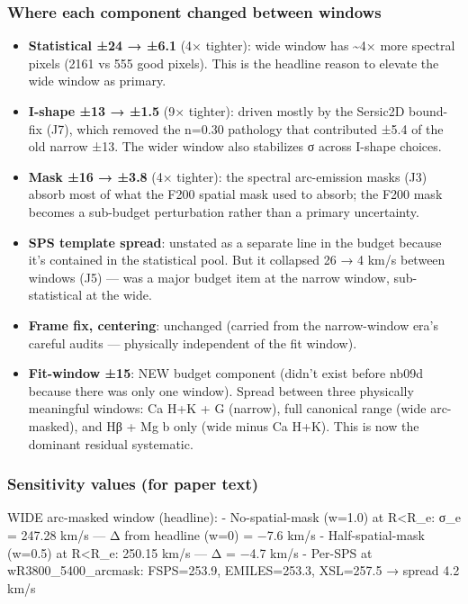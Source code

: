 \documentclass[
  10pt,
]{article}
\providecommand{\tightlist}{%
  \setlength{\itemsep}{0pt}\setlength{\parskip}{0pt}}
\begin{document}
\hypertarget{where-each-component-changed-between-windows}{%
\subsubsection{Where each component changed between windows}\label{where-each-component-changed-between-windows}}

\begin{itemize}
\tightlist
\item
  \textbf{Statistical ±24 → ±6.1} (4× tighter): wide window has \textasciitilde4× more spectral pixels (2161 vs 555 good pixels). This is the headline reason to elevate the wide window as primary.
\item
  \textbf{I-shape ±13 → ±1.5} (9× tighter): driven mostly by the Sersic2D bound-fix (J7), which removed the n=0.30 pathology that contributed ±5.4 of the old narrow ±13. The wider window also
  stabilizes σ across I-shape choices.
\item
  \textbf{Mask ±16 → ±3.8} (4× tighter): the spectral arc-emission masks (J3) absorb most of what the F200 spatial mask used to absorb; the F200 mask becomes a sub-budget perturbation rather than a
  primary uncertainty.
\item
  \textbf{SPS template spread}: unstated as a separate line in the budget because it's contained in the statistical pool. But it collapsed 26 → 4 km/s between windows (J5) --- was a major budget item
  at the narrow window, sub-statistical at the wide.
\item
  \textbf{Frame fix, centering}: unchanged (carried from the narrow-window era's careful audits --- physically independent of the fit window).
\item
  \textbf{Fit-window ±15}: NEW budget component (didn't exist before nb09d because there was only one window). Spread between three physically meaningful windows: Ca H+K + G (narrow), full canonical
  range (wide arc-masked), and Hβ + Mg b only (wide minus Ca H+K). This is now the dominant residual systematic.
\end{itemize}

\hypertarget{sensitivity-values-for-paper-text}{%
\subsubsection{Sensitivity values (for paper text)}\label{sensitivity-values-for-paper-text}}

WIDE arc-masked window (headline): - No-spatial-mask (w=1.0) at R\textless R\_e: σ\_e = 247.28 km/s --- Δ from headline (w=0) = −7.6 km/s - Half-spatial-mask (w=0.5) at R\textless R\_e: 250.15 km/s
--- Δ = −4.7 km/s - Per-SPS at wR3800\_5400\_arcmask: FSPS=253.9, EMILES=253.3, XSL=257.5 → spread 4.2 km/s
\end{document}
